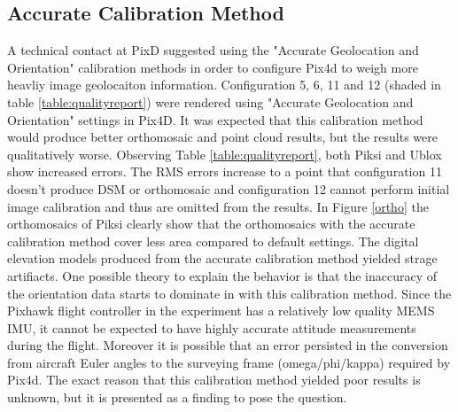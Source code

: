 \documentclass{article}
\begin{document}
\subsection{Accurate Calibration Method}
A technical contact at PixD suggested using the "Accurate Geolocation and Orientation" calibration
methods in order to configure Pix4d to weigh more heavliy image geolocaiton information.
Configuration 5, 6, 11 and 12 (shaded in table \ref{table:qualityreport}) were rendered
using "Accurate Geolocation and Orientation" settings in Pix4D.  It was expected that this
calibration method would produce better orthomosaic and point
cloud results, but the results were qualitatively worse. Observing Table \ref{table:qualityreport},
both Piksi and Ublox show increased errors. The RMS errors increase to a point that configuration 11 doesn't
produce DSM or orthomosaic and configuration 12 cannot perform initial image calibration and thus are omitted from the results.  In Figure \ref{ortho} the orthomosaics of Piksi clearly show that the orthomosaics with the accurate calibration method cover less area compared to default settings.  The digital elevation models produced from the accurate calibration method yielded strage artifiacts.
One possible theory to explain the behavior is that the inaccuracy of the orientation data
starts to dominate in with this calibration method. Since the Pixhawk flight controller in the experiment has a
relatively low quality MEMS IMU, it cannot be expected to have highly accurate attitude
measurements during the flight.  Moreover it is possible that an error persisted in the conversion
from aircraft Euler angles to the surveying frame (omega/phi/kappa) required by Pix4d.  The exact
reason that this calibration method yielded poor results is unknown, but it is presented as a finding
to pose the question.
\end{document}
